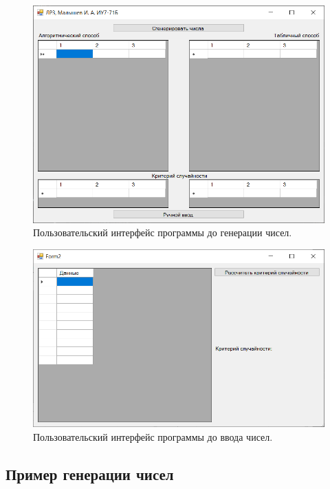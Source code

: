 \documentclass[12pt]{report}
\begin{document}
\begin{figure}[H]
	\begin{center}
		\includegraphics[scale=0.8]{imgs/ui1}
	\end{center}
	\caption{Пользовательский интерфейс программы до генерации чисел.}
	\label{img:ui1}
\end{figure}

\begin{figure}[H]
	\begin{center}
		\includegraphics[scale=0.8]{imgs/ui2.png}
	\end{center}
	\caption{Пользовательский интерфейс программы до ввода чисел.}
	\label{img:ui2}
\end{figure}

\subsection{Пример генерации чисел}
\end{document}
